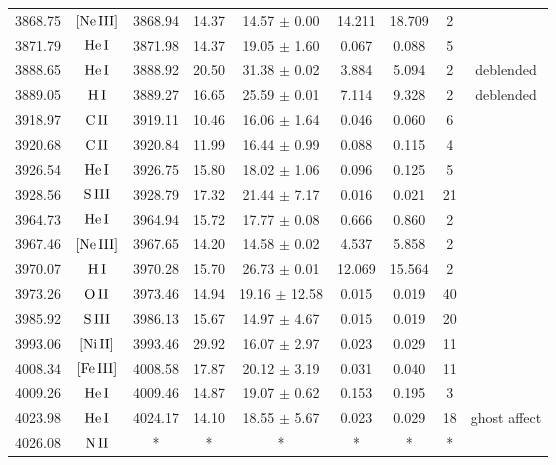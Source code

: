 \documentclass{article}
\begin{document}
\begin{table*}
\begin{adjustbox}{width=\textwidth}
\begin{tabular}{ccccccccc}
3868.75 & $\mbox{[Ne}\thinspace \mbox{III]}$ & 3868.94 & 14.37 & 14.57 $\pm$ 0.00 & 14.211 & 18.709 & 2 &  \\
3871.79 & $\mbox{He}\thinspace \mbox{I}$ & 3871.98 & 14.37 & 19.05 $\pm$ 1.60 & 0.067 & 0.088 & 5 &  \\
3888.65 & $\mbox{He}\thinspace \mbox{I}$ & 3888.92 & 20.50 & 31.38 $\pm$ 0.02 & 3.884 & 5.094 & 2 &  deblended \\
3889.05 & $\mbox{H}\thinspace \mbox{I}$ & 3889.27 & 16.65 & 25.59 $\pm$ 0.01 & 7.114 & 9.328 & 2 &  deblended \\
3918.97 & $\mbox{C}\thinspace \mbox{II}$ & 3919.11 & 10.46 & 16.06 $\pm$ 1.64 & 0.046 & 0.060 & 6 &  \\
3920.68 & $\mbox{C}\thinspace \mbox{II}$ & 3920.84 & 11.99 & 16.44 $\pm$ 0.99 & 0.088 & 0.115 & 4 &  \\
3926.54 & $\mbox{He}\thinspace \mbox{I}$ & 3926.75 & 15.80 & 18.02 $\pm$ 1.06 & 0.096 & 0.125 & 5 &  \\
3928.56 & $\mbox{S}\thinspace \mbox{III}$ & 3928.79 & 17.32 & 21.44 $\pm$ 7.17 & 0.016 & 0.021 & 21 &  \\
3964.73 & $\mbox{He}\thinspace \mbox{I}$ & 3964.94 & 15.72 & 17.77 $\pm$ 0.08 & 0.666 & 0.860 & 2 &  \\
3967.46 & $\mbox{[Ne}\thinspace \mbox{III]}$ & 3967.65 & 14.20 & 14.58 $\pm$ 0.02 & 4.537 & 5.858 & 2 &  \\
3970.07 & $\mbox{H}\thinspace \mbox{I}$ & 3970.28 & 15.70 & 26.73 $\pm$ 0.01 & 12.069 & 15.564 & 2 &  \\
3973.26 & $\mbox{O}\thinspace \mbox{II}$ & 3973.46 & 14.94 & 19.16 $\pm$ 12.58 & 0.015 & 0.019 & 40 &  \\
3985.92 & $\mbox{S}\thinspace \mbox{III}$ & 3986.13 & 15.67 & 14.97 $\pm$ 4.67 & 0.015 & 0.019 & 20 &  \\
3993.06 & $\mbox{[Ni}\thinspace \mbox{II]}$ & 3993.46 & 29.92 & 16.07 $\pm$ 2.97 & 0.023 & 0.029 & 11 &  \\
4008.34 & $\mbox{[Fe}\thinspace \mbox{III]}$ & 4008.58 & 17.87 & 20.12 $\pm$ 3.19 & 0.031 & 0.040 & 11 &  \\
4009.26 & $\mbox{He}\thinspace \mbox{I}$ & 4009.46 & 14.87 & 19.07 $\pm$ 0.62 & 0.153 & 0.195 & 3 &  \\
4023.98 & $\mbox{He}\thinspace \mbox{I}$ & 4024.17 & 14.10 & 18.55 $\pm$ 5.67 & 0.023 & 0.029 & 18 &  ghost affect \\
4026.08 & $\mbox{N}\thinspace \mbox{II}$ & * & * & * & * & * & * &  \\

\end{tabular}
\end{adjustbox}
\end{table*}
\end{document}
